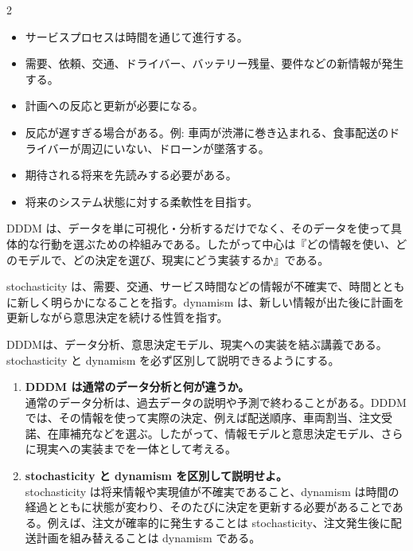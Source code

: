 

\vspace{1.5mm}

\begin{multicols}{2}

\footnotesize

\raggedcolumns


\begin{itemize}
\item サービスプロセスは時間を通じて進行する。
\item 需要、依頼、交通、ドライバー、バッテリー残量、要件などの新情報が発生する。
\item 計画への反応と更新が必要になる。
\item 反応が遅すぎる場合がある。例: 車両が渋滞に巻き込まれる、食事配送のドライバーが周辺にいない、ドローンが墜落する。
\item 期待される将来を先読みする必要がある。
\item 将来のシステム状態に対する柔軟性を目指す。
\end{itemize}

DDDM は、データを単に可視化・分析するだけでなく、そのデータを使って具体的な行動を選ぶための枠組みである。したがって中心は『どの情報を使い、どのモデルで、どの決定を選び、現実にどう実装するか』である。\par

stochasticity は、需要、交通、サービス時間などの情報が不確実で、時間とともに新しく明らかになることを指す。dynamism は、新しい情報が出た後に計画を更新しながら意思決定を続ける性質を指す。\par

DDDMは、データ分析、意思決定モデル、現実への実装を結ぶ講義である。stochasticity と dynamism を必ず区別して説明できるようにする。\par

\begin{enumerate}
\item \textbf{DDDM は通常のデータ分析と何が違うか。}\\
通常のデータ分析は、過去データの説明や予測で終わることがある。DDDMでは、その情報を使って実際の決定、例えば配送順序、車両割当、注文受諾、在庫補充などを選ぶ。したがって、情報モデルと意思決定モデル、さらに現実への実装までを一体として考える。
\item \textbf{stochasticity と dynamism を区別して説明せよ。}\\
stochasticity は将来情報や実現値が不確実であること、dynamism は時間の経過とともに状態が変わり、そのたびに決定を更新する必要があることである。例えば、注文が確率的に発生することは stochasticity、注文発生後に配送計画を組み替えることは dynamism である。
\end{enumerate}

\end{multicols}

